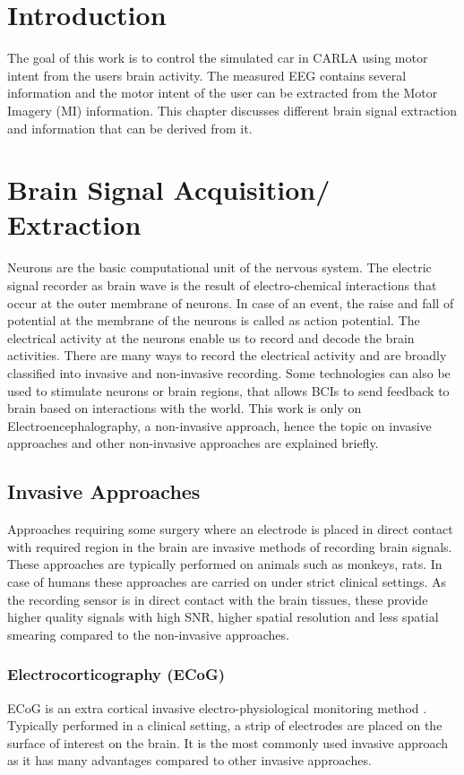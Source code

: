 \section*{Introduction}
The goal of this work is to control the simulated car in CARLA using motor intent from the users brain activity. The measured EEG contains several information and the motor intent of the user can be extracted from the Motor Imagery (MI) information. This chapter discusses different brain signal extraction and information that can be derived from it.

\section{Brain Signal Acquisition/ Extraction}
Neurons are the basic computational unit of the nervous system. The electric signal recorder as brain wave is the result of electro-chemical interactions that occur at the outer membrane of neurons. In case of an event, the raise and fall of potential at the membrane of the neurons is called as action potential. The electrical activity at the neurons enable us to record and decode the brain activities. There are many ways to record the electrical activity and are broadly classified into invasive and non-invasive recording. Some technologies can also be used to stimulate neurons or brain regions, that allows BCIs to send feedback to brain based on interactions with the world. This work is only on Electroencephalography, a  non-invasive approach, hence the topic on invasive approaches and other non-invasive approaches are explained briefly.

\subsection{Invasive Approaches}
Approaches requiring some surgery where an electrode is placed in direct contact with required region in the brain are invasive methods of recording brain signals. These approaches are typically performed on animals such as monkeys, rats. In case of humans these approaches are carried on under strict clinical settings. As the recording sensor is in direct contact with the brain tissues, these provide higher quality signals with high SNR, higher spatial resolution and less spatial smearing compared to the non-invasive approaches.

\subsubsection{Electrocorticography (ECoG)}
ECoG is an extra cortical invasive electro-physiological monitoring method \cite{2021_Book_Deep_Learning_EEG}. Typically performed in a clinical setting, a strip of electrodes are placed on the surface of interest on the brain. It is the most commonly used invasive approach as it has many advantages compared to other invasive approaches.


